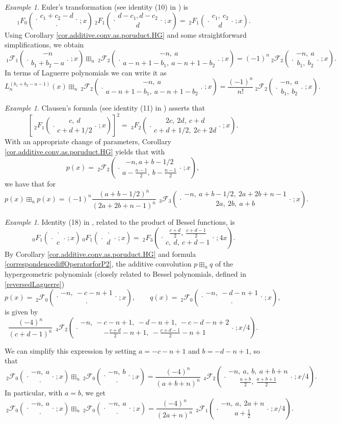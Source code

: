 \documentclass[reqno,11pt]{amsart}
\theoremstyle{remark}
\newtheorem{example}[theorem]{Example}
\newcommand{\raising}[2]{\left(#1\right)^{\overline{#2}}}
\newcommand*\pFq[5]{%
 {\ }_{#1}{\mathcal F}_{#2}{\left(\genfrac..{0pt}{}{#3}{#4};#5\right)}%
}
\newcommand*\HGF[5]{%
 {\ }_{#1} F_{#2}{\left(\genfrac..{0pt}{}{#3}{#4};#5\right)}%
}
\begin{document}
\begin{example} 
\label{example38}
Euler's transformation (see identity (10) in \cite{grinshpan2013generalized}) is  
$$
\HGF{1}{0}{c_1+c_2-d}{\cdot}{x}  \HGF{2}{1}{d-c_1, d-c_2}{d}{ x}=\HGF{2}{1}{c_1,\ c_2}{d}{x}.
$$
Using Corollary \ref{cor.additive.conv.as.poruduct.HG} and some straightforward simplifications, we obtain
$$
\pFq{1}{1}{-n}{b_1+b_2-a}{x} \boxplus_n \pFq{2}{2}{-n,\ a}{a-n+1-b_1,\ a-n+1-b_2}{x} =(-1)^n \pFq{2}{2}{-n,\ a}{b_1,\ b_2}{x}.
$$
In terms of Laguerre polynomials we can write it as
$$
L_n^{(b_1+b_2-a-1)}(x) \boxplus_n \pFq{2}{2}{-n,\ a}{a-n+1-b_1,\ a-n+1-b_2}{x} =\frac{(-1)^n}{n!} \pFq{2}{2}{-n,\ a}{b_1,\ b_2}{x}.
$$
\end{example}

\begin{example} \label{example39}
Clausen's formula (see identity (11) in \cite{grinshpan2013generalized}) asserts that
$$
\left[  \HGF{2}{1}{c,\ d}{c+d+1/2}{x}\right]^2=\HGF{3}{2}{2c,\ 2d,\ c+d}{c+d+1/2,\  2c+2d}{x}.
$$
With an appropriate change of parameters, Corollary \ref{cor.additive.conv.as.poruduct.HG} yields that with
\begin{equation}
    \label{eq:pForexample3.10}
p(x)=\pFq{2}{2}{-n,a+b-1/2}{a - \frac{n-1}{2},\ b- \frac{n-1}{2}}{x},
\end{equation}
we have that for
\begin{equation}
    \label{eq:ConvForexample3.10}
    p(x) \boxplus_n p(x)= (-1)^n \frac{\raising{a+b-1/2}{n}}{\raising{2a+2b+n-1}{n}}\, \pFq{3}{3}{-n,\ a+b-1/2,\ 2a+2b+n-1}{2a,\ 2b,\ a+b}{x}.
\end{equation}
\end{example}

\begin{example}
\label{exm:2F0.plus.2F0}
Identity (18) in \cite{grinshpan2013generalized}, related to the product of Bessel functions, is 
$$
\HGF{0}{1}{\cdot}{c}{x}  \HGF{0}{1}{\cdot}{d}{x}=\HGF{2}{3}{\frac{c+d}{2},\ \frac{c+d-1}{2}}{c,\ d,\ c+d-1}{4x}.
$$
By Corollary \ref{cor.additive.conv.as.poruduct.HG} and formula \eqref{correspondencediffOperatorforP2}, the additive convolution $p\boxplus_n q$ of the hypergeometric polynomials (closely related to Bessel polynomials, defined in \eqref{reversedLaguerre})
\begin{equation}
    \label{besselPexample311}
    p(x)=\pFq{2}{0}{-n,\ -c-n+1}{\cdot}{x}, \qquad q(x)=\pFq{2}{0}{-n,\ -d-n+1}{\cdot}{x},
\end{equation}
is given by
$$
\frac{(-4)^n   }{ \raising{c+d-1}{n}}\, \pFq{4}{2}{-n,\ -c-n+1,\ -d-n+1,\ -c-d-n+2}{-\frac{c+d}{2}-n+1,\ -\frac{c+d-1}{2}-n+1}{x/4}.
$$

We can simplify this expression by setting $a=-c-n+1$ and $b=-d-n+1$, so that
$$
\pFq{2}{0}{-n,\ a}{\cdot}{x} \boxplus_n \pFq{2}{0}{-n,\ b}{\cdot}{x} = \frac{(-4)^n   }{ \raising{a+b+n}{n}}\,  \pFq{4}{2}{-n,\ a,\ b,\ a+b+n}{\frac{a+b}{2},\ \frac{a+b+1}{2}}{x/4}.
$$
In particular, with $a=b$, we get
$$
\pFq{2}{0}{-n,\ a}{\cdot}{x} \boxplus_n \pFq{2}{0}{-n,\ a}{\cdot}{x} = \frac{(-4)^n   }{ \raising{2a+n}{n}}\,  \pFq{3}{1}{-n,\ a, \ 2a +n}{ a+\frac{ 1}{2}}{x/4}.
$$
\end{example}
\end{document}
